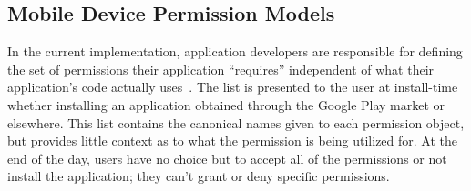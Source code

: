 
  

\subsection{Mobile Device Permission Models}

In the current implementation, application developers are responsible for defining the set of permissions their application “requires” independent of what their application’s code actually uses~\cite{Felt}.  The list is presented to the user at install-time whether installing an application obtained through the Google Play market or elsewhere.  This list contains the canonical names given to each permission object, but provides little context as to what the permission is being utilized for.  At the end of the day, users have no choice but to accept all of the permissions or not install the application; they can't grant or deny specific permissions.

